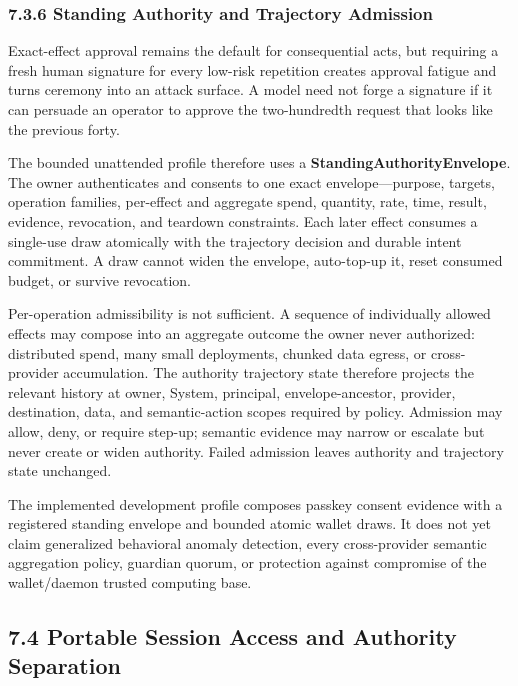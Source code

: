 \documentclass[
  11pt,
]{article}
\begin{document}
\hypertarget{standing-authority-and-trajectory-admission}{%
\subsubsection{7.3.6 Standing Authority and Trajectory
Admission}\label{standing-authority-and-trajectory-admission}}

Exact-effect approval remains the default for consequential acts, but requiring
a fresh human signature for every low-risk repetition creates approval fatigue
and turns ceremony into an attack surface. A model need not forge a signature
if it can persuade an operator to approve the two-hundredth request that looks
like the previous forty.

The bounded unattended profile therefore uses a
\textbf{StandingAuthorityEnvelope}. The owner authenticates and consents to one
exact envelope---purpose, targets, operation families, per-effect and aggregate
spend, quantity, rate, time, result, evidence, revocation, and teardown
constraints. Each later effect consumes a single-use draw atomically with the
trajectory decision and durable intent commitment. A draw cannot widen the
envelope, auto-top-up it, reset consumed budget, or survive revocation.

Per-operation admissibility is not sufficient. A sequence of individually
allowed effects may compose into an aggregate outcome the owner never
authorized: distributed spend, many small deployments, chunked data egress, or
cross-provider accumulation. The authority trajectory state therefore projects
the relevant history at owner, System, principal, envelope-ancestor, provider,
destination, data, and semantic-action scopes required by policy. Admission may
allow, deny, or require step-up; semantic evidence may narrow or escalate but
never create or widen authority. Failed admission leaves authority and
trajectory state unchanged.

The implemented development profile composes passkey consent evidence with a
registered standing envelope and bounded atomic wallet draws. It does not yet
claim generalized behavioral anomaly detection, every cross-provider semantic
aggregation policy, guardian quorum, or protection against compromise of the
wallet/daemon trusted computing base.

\hypertarget{portable-app-sessions-agentgres-authority}{%
\subsection{7.4 Portable Session Access and Authority
Separation}\label{portable-app-sessions-agentgres-authority}}
\end{document}
